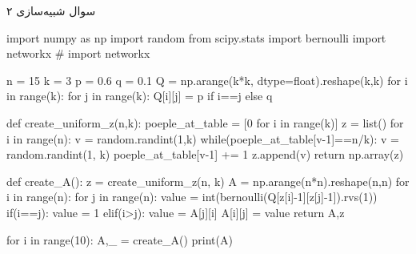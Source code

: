 سوال شبیه‌سازی ۲

\begin{latin}
\begin{python}
import numpy as np
import random
from scipy.stats import bernoulli
import networkx
# import networkx

n = 15
k = 3
p = 0.6
q = 0.1
Q = np.arange(k*k, dtype=float).reshape(k,k)
for i in range(k):
    for j in range(k):
        Q[i][j] = p if i==j else q

def create_uniform_z(n,k):
    poeple_at_table = [0 for i in range(k)]
    z = list()
    for i in range(n):
        v = random.randint(1,k)
        while(poeple_at_table[v-1]==n/k): v = random.randint(1, k)
        poeple_at_table[v-1] += 1
        z.append(v)
    return np.array(z)


def create_A():
    z = create_uniform_z(n, k)
    A = np.arange(n*n).reshape(n,n)
    for i in range(n):
        for j in range(n):
            value = int(bernoulli(Q[z[i]-1][z[j]-1]).rvs(1))
            if(i==j): value = 1
            elif(i>j): value = A[j][i]
            A[i][j] = value
    return A,z

for i in range(10):
    A,_ = create_A()
    print(A)
\end{python}
\end{latin}